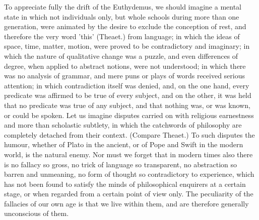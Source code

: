 \documentclass[11pt,letter]{article}
\begin{document}
\par  To appreciate fully the drift of the Euthydemus, we should imagine a mental state in which not individuals only, but whole schools during more than one generation, were animated by the desire to exclude the conception of rest, and therefore the very word 'this' (Theaet.) from language; in which the ideas of space, time, matter, motion, were proved to be contradictory and imaginary; in which the nature of qualitative change was a puzzle, and even differences of degree, when applied to abstract notions, were not understood; in which there was no analysis of grammar, and mere puns or plays of words received serious attention; in which contradiction itself was denied, and, on the one hand, every predicate was affirmed to be true of every subject, and on the other, it was held that no predicate was true of any subject, and that nothing was, or was known, or could be spoken. Let us imagine disputes carried on with religious earnestness and more than scholastic subtlety, in which the catchwords of philosophy are completely detached from their context. (Compare Theaet.) To such disputes the humour, whether of Plato in the ancient, or of Pope and Swift in the modern world, is the natural enemy. Nor must we forget that in modern times also there is no fallacy so gross, no trick of language so transparent, no abstraction so barren and unmeaning, no form of thought so contradictory to experience, which has not been found to satisfy the minds of philosophical enquirers at a certain stage, or when regarded from a certain point of view only. The peculiarity of the fallacies of our own age is that we live within them, and are therefore generally unconscious of them.
\end{document}

